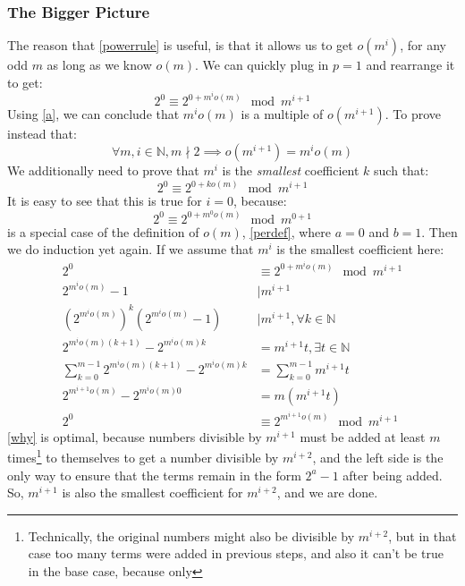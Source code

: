 \documentclass{article}
\begin{document}
  \subsubsection{The Bigger Picture}
  The reason that \eqref{powerrule} is useful, is that it allows us to get $o(m^i)$, for any odd $m$ as long as we know $o(m)$. We can quickly plug in $p = 1$ and rearrange it to get:
  \begin{equation}
    2^0 \equiv 2^{0+m^io(m)} \mod m^{i+1}
  \end{equation}
  Using \eqref{a}, we can conclude that $m^io(m)$ is a multiple of $o(m^{i+1})$. To prove instead that:
  \begin{equation}
    \forall m, i \in \mathbb{N}, m \nmid 2 \implies o(m^{i+1}) = m^io(m) 
  \end{equation}
  We additionally need to prove that $m^i$ is the \emph{smallest} coefficient $k$ such that:
  \begin{equation}
    2^0 \equiv 2^{0 + ko(m)} \mod m^{i+1}
  \end{equation}
  It is easy to see that this is true for $i=0$, because:
  \begin{equation}
    2^0 \equiv 2^{0 + m^0o(m)} \mod m^{0+1}
  \end{equation}
  is a special case of the definition of $o(m)$, \eqref{perdef}, where $a=0$ and $b=1$. Then we do induction yet again. If we assume that $m^i$ is the smallest coefficient here:
  \begin{align}
    2^0 &\equiv 2^{0 + m^io(m)} \mod m^{i+1}\\
    2^{m^io(m)} - 1 &\mid m^{i+1}\\
    (2^{m^io(m)})^k(2^{m^io(m)} - 1) &\mid m^{i+1}, \forall k \in \mathbb{N}\\
    2^{m^io(m)(k+1)} - 2^{m^io(m)k} &=  m^{i+1}t, \exists t \in \mathbb{N}\\
    \sum^{m-1}_{k=0}2^{m^io(m)(k+1)} - 2^{m^io(m)k} &= \sum^{m-1}_{k=0}m^{i+1}t\label{why}\\
    2^{m^{i+1}o(m)} - 2^{m^io(m)0} &= m(m^{i+1}t)\\
    2^0 &\equiv 2^{m^{i+1}o(m)} \mod m^{i+1}
  \end{align}
  \eqref{why} is optimal, because numbers divisible by $m^{i+1}$ must be added at least $m$ times\footnote{Technically, the original numbers might also be divisible by $m^{i+2}$, but in that case too many terms were added in previous steps, and also it can't be true in the base case, because only } to themselves to get a number divisible by $m^{i+2}$, and the left side is the only way to ensure that the terms remain in the form $2^a-1$ after being added. So, $m^{i+1}$ is also the smallest coefficient for $m^{i+2}$, and we are done.\\
  
\end{document}
